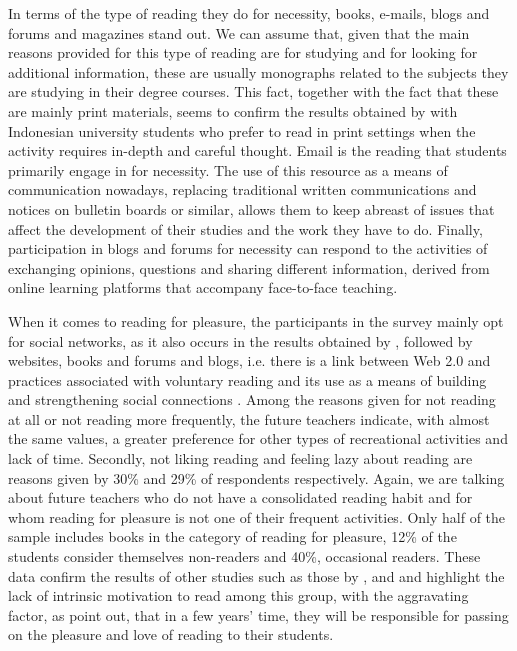 \documentclass[english]{textolivre}
\begin{document}
In terms of the type of reading they do for necessity, books, e-mails, blogs and forums and magazines stand out. We can assume that, given that the main reasons provided for this type of reading are for studying and for looking for additional information, these are usually monographs related to the subjects they are studying in their degree courses. This fact, together with the fact that these are mainly print materials, seems to confirm the results obtained by \textcite{putro_profiles_2018} with Indonesian university students who prefer to read in print settings when the activity requires in-depth and careful thought. Email is the reading that students primarily engage in for necessity. The use of this resource as a means of communication nowadays, replacing traditional written communications and notices on bulletin boards or similar, allows them to keep abreast of issues that affect the development of their studies and the work they have to do. Finally, participation in blogs and forums for necessity can respond to the activities of exchanging opinions, questions and sharing different information, derived from online learning platforms that accompany face-to-face teaching. 

When it comes to reading for pleasure, the participants in the survey mainly opt for social networks, as it also occurs in the results obtained by \textcite{castillo_rodriguez_habitos_2022}, followed by websites, books and forums and blogs, i.e. there is a link between Web 2.0 and practices associated with voluntary reading \cite{alcocer_vazquez_practicas_2021} and its use as a means of building and strengthening social connections \cite{putro_profiles_2018}. Among the reasons given for not reading at all or not reading more frequently, the future teachers indicate, with almost the same values, a greater preference for other types of recreational activities and lack of time. Secondly, not liking reading and feeling lazy about reading are reasons given by 30\% and 29\% of respondents respectively. Again, we are talking about future teachers who do not have a consolidated reading habit and for whom reading for pleasure is not one of their frequent activities. Only half of the sample includes books in the category of reading for pleasure, 12\% of the students consider themselves non-readers and 40\%, occasional readers. These data confirm the results of other studies such as those by \textcite{munita_reading_2014}, \textcite{elche_larranaga_compleja_2019} and \textcite{trigo_habitos_2020} and highlight the lack of intrinsic motivation to read among this group, with the aggravating factor, as \textcite{felipe_morales_percepciones_2016} point out, that in a few years’ time, they will be responsible for passing on the pleasure and love of reading to their students. 
\end{document}
